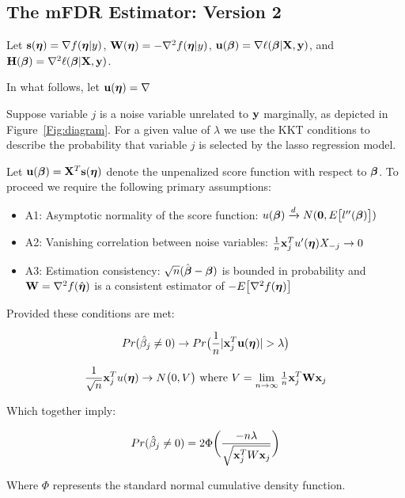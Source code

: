 \subsection{The mFDR Estimator: Version 2}

Let $\mathbf{s}(\boldsymbol{\eta})=\nabla f(\boldsymbol{\eta}|y)$, $\mathbf{W}(\boldsymbol{\eta}) = -\nabla^2 f(\boldsymbol{\eta}|y)$, $\mathbf{u}(\boldsymbol{\beta})=\nabla \ell(\boldsymbol{\beta}|\mathbf{X},\mathbf{y})$, and $\mathbf{H}(\boldsymbol{\beta})=\nabla^2 \ell(\boldsymbol{\beta}|\mathbf{X},\mathbf{y})$.  

In what follows, let $\mathbf{u}(\boldsymbol{\eta}) = \nabla$

Suppose variable $j$ is a noise variable unrelated to $\mathbf{y}$ marginally, as depicted in Figure~\ref{Fig:diagram}. For a given value of $\lambda$ we use the KKT conditions to describe the probability that variable $j$ is selected by the lasso regression model.

Let $\mathbf{u}(\boldsymbol{\beta}) = \mathbf{X}^T \mathbf{s}(\boldsymbol{\eta})$ denote the unpenalized score function with respect to $\boldsymbol{\beta}$.  To proceed we require the following primary assumptions:

\begin{itemize}
\item A1: Asymptotic normality of the score function: $u(\boldsymbol{\beta}) \xrightarrow{d} N(\mathbf{0},  E\big[l''(\boldsymbol{\beta})\big])$
\item A2: Vanishing correlation between noise variables: $\frac{1}{n}\mathbf{x}_j^T u'(\boldsymbol{\eta})X_{-j} \rightarrow 0$
\item A3: Estimation consistency: $\sqrt{n}(\hat{\boldsymbol{\beta}}-  \boldsymbol{\beta})$ is bounded in probability and $\mathbf{W} = \nabla^2 f(\hat{\boldsymbol{\eta}})$ is a consistent estimator of $-E\big[\nabla^2 f(\boldsymbol{\eta})\big]$
\end{itemize}

 Provided these conditions are met:

\begin{equation}
Pr(\hat{\beta}_j \neq 0)  \rightarrow Pr\big(\frac{1}{n}|\mathbf{x}_{j}^T \mathbf{u}(\boldsymbol{\eta})| > \lambda\big)
\end{equation}

\begin{equation}
\frac{1}{\sqrt{n}}\mathbf{x}_{j}^T u(\boldsymbol{\eta}) \rightarrow N\big(0, V\big) 
\text{   where } V = \lim_{n \to \infty} \tfrac{1}{n}\mathbf{x}_{j}^T \mathbf{W} \mathbf{x}_{j}
\end{equation}

Which together imply:

\begin{equation}
Pr(\hat{\beta}_j \neq 0)  = 2\Phi \bigg( \frac{-n\lambda}{\sqrt{ \mathbf{x}_j^TW\mathbf{x}_j}} \bigg)
\end{equation}

Where $\Phi$ represents the standard normal cumulative density function.

